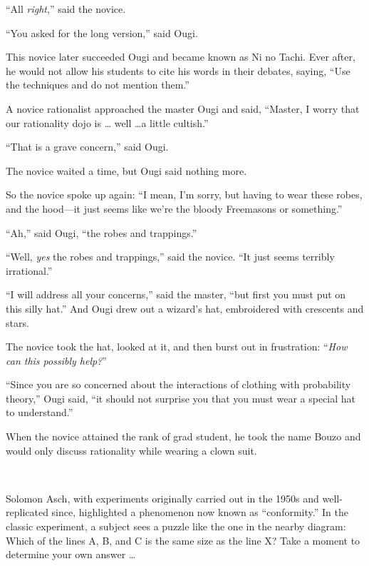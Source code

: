 {
 ``All \textit{right},'' said
the novice.}

{
 ``You asked for the long
version,'' said Ougi.}

{
 This novice later succeeded Ougi and became known as Ni no Tachi.
Ever after, he would not allow his students to cite his words in their
debates, saying, ``Use the techniques and do not
mention them.''}

\hr

{
 A novice rationalist approached the master Ougi and said,
``Master, I worry that our rationality dojo is \ldots
well \ldots a little cultish.''}

{
 ``That is a grave concern,''
said Ougi.}

{
 The novice waited a time, but Ougi said nothing more.}

{
 So the novice spoke up again: ``I mean,
I'm sorry, but having to wear these robes, and the
hood---it just seems like we're the bloody Freemasons
or something.''}

{
 ``Ah,'' said Ougi,
``the robes and trappings.''}

{
 ``Well, \textit{yes} the robes and
trappings,'' said the novice. ``It
just seems terribly irrational.''}

{
 ``I will address all your
concerns,'' said the master, ``but
first you must put on this silly hat.'' And Ougi drew
out a wizard's hat, embroidered with crescents and
stars.}

{
 The novice took the hat, looked at it, and then burst out in
frustration: ``\textit{How can this possibly
help?}''}

{
 ``Since you are so concerned about the
interactions of clothing with probability theory,''
Ougi said, ``it should not surprise you that you must
wear a special hat to understand.''}

{
 When the novice attained the rank of grad student, he took the
name Bouzo and would only discuss rationality while wearing a clown
suit.}

\myendsectiontext




{
 ~}

{
 Solomon Asch, with experiments originally carried out in the 1950s
and well-replicated since, highlighted a phenomenon now known as
``conformity.'' In the classic
experiment, a subject sees a puzzle like the one in the nearby diagram:
Which of the lines A, B, and C is the same size as the line X? Take a
moment to determine your own answer \ldots}

